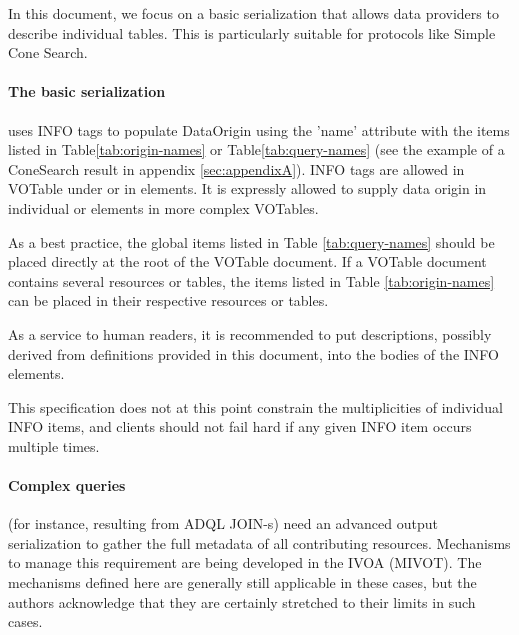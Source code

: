 \documentclass[11pt,a4paper]{ivoa}
\begin{document}
In this document, we focus on a basic serialization that allows data
providers to describe individual tables.
This is particularly suitable for protocols like Simple Cone Search.

\paragraph{The basic serialization} uses INFO tags to populate DataOrigin using the 'name' attribute with the items listed in Table\ref{tab:origin-names} or Table\ref{tab:query-names} (see the example of a ConeSearch result in appendix  \ref{sec:appendixA}). 
INFO tags are allowed in VOTable under  or in  elements.
It is expressly allowed to supply data origin in individual
 or  elements in more complex VOTables.

As a best practice, the global items listed in Table \ref{tab:query-names} should be placed directly at the root of the VOTable document. If a VOTable document contains several resources or tables, the items listed in Table \ref{tab:origin-names} can be placed in their respective resources or tables.

As a service to human readers, it is recommended to put descriptions, possibly derived from definitions provided in this document, into the bodies of the INFO elements.

This specification does not at this point constrain the multiplicities of individual INFO items, and clients should not fail hard if any given INFO item occurs multiple times.



\paragraph{Complex queries} (for instance, resulting from ADQL JOIN-s) need an advanced output serialization to gather the full metadata of all contributing resources.
Mechanisms to manage this requirement are being developed in the IVOA
(MIVOT).
The mechanisms defined here are generally still applicable in these
cases, but the authors acknowledge that they are certainly stretched to
their limits in such cases.
\end{document}
